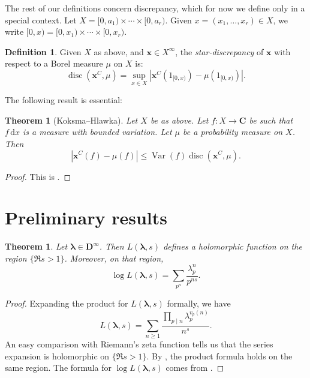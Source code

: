 \documentclass{article}
\DeclareMathOperator{\disc}{disc}
\DeclareMathOperator{\Var}{Var}
\newcommand{\bC}{\mathbf{C}}
\newcommand{\bD}{\mathbf{D}}
\newcommand{\blambda}{{\boldsymbol{\lambda}}}
\newcommand{\bx}{{\boldsymbol x}}
\newcommand{\dd}{\mathrm{d}}
\newtheorem{theorem}[subsection]{Theorem}
\theoremstyle{definition}
\newtheorem{definition}[subsection]{Definition}
\begin{document}
The rest of our definitions concern discrepancy, which for now we define only 
in a special context. Let $X=[0,a_1)\times \cdots \times [0,a_r)$. Given 
$x=(x_1,\dots,x_r)\in X$, we write $[0,x)=[0,x_1)\times \cdots \times [0,x_r)$. 

\begin{definition}
Given $X$ as above, and $\bx\in X^\infty$, the \emph{star-discrepancy} of $\bx$ 
with respect to a Borel measure $\mu$ on $X$ is:
\[
	\disc(\bx^C,\mu) = \sup_{x\in X} \left|\bx^C(1_{[0,x)}) - \mu(1_{[0,x)})\right| .
\]
\end{definition}

The following result is essential:

\begin{theorem}[Koksma--Hlawka]
Let $X$ be as above. Let $f\colon X\to \bC$ be such that $f\, \dd x$ is a 
measure with bounded variation. Let $\mu$ be a probability measure on $X$. Then 
\[
	|\bx^C(f) - \mu(f)| \leqslant \Var(f) \disc(\bx^C,\mu) .
\]
\end{theorem}
\begin{proof}
This is \cite[Th.~3.2]{okten-1999}. 
\end{proof}





\section{Preliminary results}\label{sec:prelim-result}

\begin{theorem}
Let $\blambda\in \bD^\infty$. Then $L(\blambda,s)$ defines a holomorphic 
function on the region $\{\Re s>1\}$. Moreover, on that region, 
\[
	\log L(\blambda,s) = \sum_{p^n} \frac{\lambda_p^n}{p^{n s}} .
\]
\end{theorem}
\begin{proof}
Expanding the product for $L(\blambda,s)$ formally, we have 
\[
	L(\blambda,s) = \sum_{n\geqslant 1} \frac{\prod_{p\mid n} \lambda_p^{v_p(n)}}{n^s} .
\]
An easy comparison with Riemann's zeta function tells us that the series 
expansion is holomorphic on $\{\Re s>1\}$. By \cite[Th.~11.7]{apostol-1976}, 
the product formula holds on the same region. The formula for 
$\log L(\blambda,s)$ comes from \cite[11.9 Ex.~2]{apostol-1976}.
\end{proof}
\end{document}
